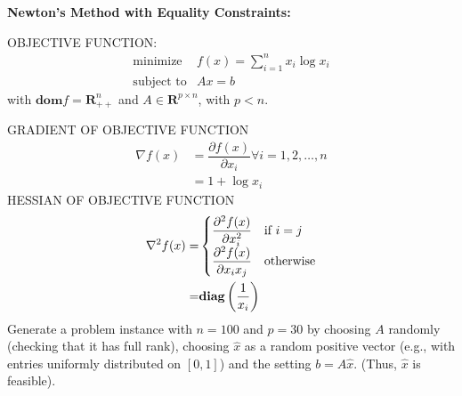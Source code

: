 \begin{prob}[3]\textbf{Newton's Method with Equality Constraints:}
\end{prob}
OBJECTIVE FUNCTION:
  \begin{eqnarray*}
    \mbox{minimize} & f(x) = \sum_{i=1}^{n} x_{i} \log x_{i}\\
    \mbox{subject to} & Ax = b
  \end{eqnarray*}
    with $\mathbf{dom} f = \mathbf{R}^{n}_{++}$ and $A \in \mathbf{R}^{p \times n}$,
  with $p < n$.
  
GRADIENT OF OBJECTIVE FUNCTION
\begin{eqnarray*}
\nabla f(x) &= \dfrac{\partial f(x)}{\partial x_{i}} \forall i = 1,2,\ldots,n\\
 &= 1 + \log x_{i}
\end{eqnarray*}
HESSIAN OF OBJECTIVE FUNCTION
\begin{eqnarray*}
\nabla^{2} f(x) =& \begin{cases}
\dfrac{\partial^{2} f(x)}{\partial x_{i}^{2}} & \mbox{if } i = j\\
\dfrac{\partial^{2} f(x)}{\partial x_{i}x_{j}} & \mbox{otherwise}\\
\end{cases}\\
 =& \mbox{\textbf{diag}}\left (\dfrac{1}{x_{i}} \right )
\end{eqnarray*}
Generate a problem instance with $n = 100$ and $p = 30$ by choosing $A$ randomly (checking that it has full rank), choosing $\widehat{x}$
  as a random positive vector (e.g., with entries uniformly distributed on
  $[0, 1]$) and the setting $b = A \widehat{x}$. (Thus, $\widehat{x}$ is
  feasible).

